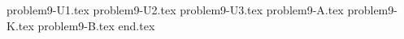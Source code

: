 \documentclass{../../../../style/mkimain}
\begin{document}
{problem9-U1.tex}
{problem9-U2.tex}
{problem9-U3.tex}
{problem9-A.tex}
{problem9-K.tex}
{problem9-B.tex}
{end.tex}
\end{document}
